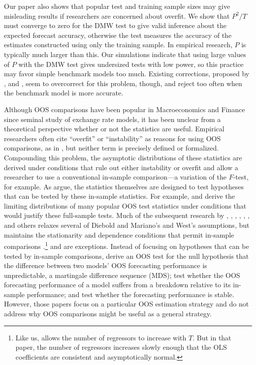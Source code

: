 \documentclass[12pt,draft]{article}
\begin{document}
Our paper also shows that popular test and training sample sizes may
give misleading results if researchers are concerned about overfit.
We show that $P^2/T$ must converge to zero for the DMW test to give
valid inference about the expected forecast accuracy, otherwise the
test measures the accuracy of the estimates constructed using only the
training sample.  In empirical research, $P$ is typically much larger
than this.  Our simulations indicate that using large values of $P$
with the DMW test gives undersized tests with low power, so this
practice may favor simple benchmark models too much.  Existing
corrections, proposed by \citet{ClM:01,ClM:05}, \citet{Mcc:07} and
\citet{ClW:06,ClW:07}, seem to overcorrect for this problem, though, and reject
too often when the benchmark model is more accurate.

Although OOS comparisons have been popular in Macroeconomics and
Finance since  seminal study of exchange rate models,
it has been unclear from a theoretical perspective whether or not the
statistics are useful.  Empirical researchers often cite ``overfit''
or ``instability'' as reasons for using OOS comparisons, as in
\citet{StW:03}, but neither term is precisely defined or formalized.
Compounding this problem, the asymptotic distributions of these
statistics are derived under conditions that rule out either
instability or overfit and allow a researcher to use a conventional
in-sample comparison---a variation of the $F$-test, for example.  As
\citet{InK:04} argue, the statistics themselves are designed to test
hypotheses that can be tested by these in-sample statistics.  For
example, \citet{DiM:95} and \citet{Wes:96} derive the limiting
distributions of many popular OOS test statistics under conditions
that would justify these full-sample tests.  Much
of the subsequent research by \citet{Mcc:00, Mcc:07}, \citet{CCS:01},
\citet{ClM:01,ClM:05}, \citet{CoS:02,CoS:04}, \citet{ClW:06,ClW:07},
\citet{Ana:07}, and others relaxes several of Diebold and Mariano's
and West's assumptions, but maintains the stationarity and dependence
conditions that permit in-sample comparisons \citep[see][for a
review of this literature]{Wes:06}.\footnote{%
  Like us, \citet{Ana:07} allows the number of regressors to increase
  with $T$.  But in that paper, the number of regressors increases
  slowly enough that the OLS coefficients are consistent and
  asymptotically normal.} %
\citet{GiW:06} and
\citet{GiR:09, GiR:10} are exceptions.  Instead of focusing on
hypotheses that can be tested by in-sample comparisons, \citet{GiW:06}
derive an OOS test for the null hypothesis that the difference
between two models' OOS forecasting performance is unpredictable, a
martingale difference sequence (MDS); \citet{GiR:09} test whether the OOS
forecasting performance of a model suffers from a breakdown relative
to its in-sample performance; and \citet{GiR:10} test whether the
forecasting performance is stable. However, those papers focus on a
particular OOS estimation strategy and do not address why OOS
comparisons might be useful as a general strategy.
\end{document}
